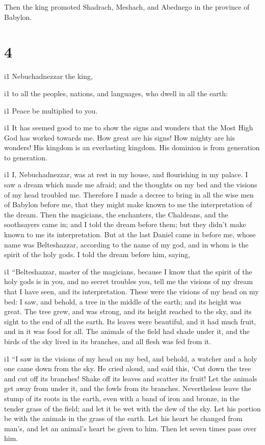  Then the king promoted Shadrach, Meshach, and Abednego in
the province of Babylon.

\hypertarget{section-3}{%
\section{4}\label{section-3}}

i1 Nebuchadnezzar the king,

i1 to all the peoples, nations, and languages, who dwell in all the
earth:

i1 Peace be multiplied to you.

i1 It has seemed good to me to show the signs and wonders
that the Most High God has worked towards me.  How great are
his signs! How mighty are his wonders! His kingdom is an everlasting
kingdom. His dominion is from generation to generation.

i1 I, Nebuchadnezzar, was at rest in my house, and
flourishing in my palace.  I saw a dream which made me
afraid; and the thoughts on my bed and the visions of my head troubled
me.  Therefore I made a decree to bring in all the wise men
of Babylon before me, that they might make known to me the
interpretation of the dream.  Then the magicians, the
enchanters, the Chaldeans, and the soothsayers came in; and I told the
dream before them; but they didn't make known to me its interpretation.
 But at the last Daniel came in before me, whose name was
Belteshazzar, according to the name of my god, and in whom is the spirit
of the holy gods. I told the dream before him, saying,

i1 ``Belteshazzar, master of the magicians, because I know
that the spirit of the holy gods is in you, and no secret troubles you,
tell me the visions of my dream that I have seen, and its
interpretation.  These were the visions of my head on my
bed: I saw, and behold, a tree in the middle of the earth; and its
height was great.  The tree grew, and was strong, and its
height reached to the sky, and its sight to the end of all the earth.
 Its leaves were beautiful, and it had much fruit, and in
it was food for all. The animals of the field had shade under it, and
the birds of the sky lived in its branches, and all flesh was fed from
it.

i1 ``I saw in the visions of my head on my bed, and behold,
a watcher and a holy one came down from the sky.  He cried
aloud, and said this, `Cut down the tree and cut off its branches! Shake
off its leaves and scatter its fruit! Let the animals get away from
under it, and the fowls from its branches.  Nevertheless
leave the stump of its roots in the earth, even with a band of iron and
bronze, in the tender grass of the field; and let it be wet with the dew
of the sky. Let his portion be with the animals in the grass of the
earth.  Let his heart be changed from man's, and let an
animal's heart be given to him. Then let seven times pass over him.

